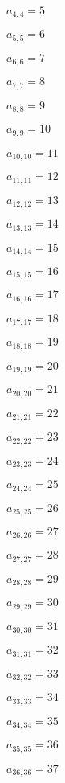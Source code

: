 \documentclass[a4paper,12pt]{article}
\begin{document}
$a _{ 4, 4 } = 5$

$a _{ 5, 5 } = 6$

$a _{ 6, 6 } = 7$

$a _{ 7, 7 } = 8$

$a _{ 8, 8 } = 9$

$a _{ 9, 9 } = 10$

$a _{ 10, 10 } = 11$

$a _{ 11, 11 } = 12$

$a _{ 12, 12 } = 13$

$a _{ 13, 13 } = 14$

$a _{ 14, 14 } = 15$

$a _{ 15, 15 } = 16$

$a _{ 16, 16 } = 17$

$a _{ 17, 17 } = 18$

$a _{ 18, 18 } = 19$

$a _{ 19, 19 } = 20$

$a _{ 20, 20 } = 21$

$a _{ 21, 21 } = 22$

$a _{ 22, 22 } = 23$

$a _{ 23, 23 } = 24$

$a _{ 24, 24 } = 25$

$a _{ 25, 25 } = 26$

$a _{ 26, 26 } = 27$

$a _{ 27, 27 } = 28$

$a _{ 28, 28 } = 29$

$a _{ 29, 29 } = 30$

$a _{ 30, 30 } = 31$

$a _{ 31, 31 } = 32$

$a _{ 32, 32 } = 33$

$a _{ 33, 33 } = 34$

$a _{ 34, 34 } = 35$

$a _{ 35, 35 } = 36$

$a _{ 36, 36 } = 37$
\end{document}
